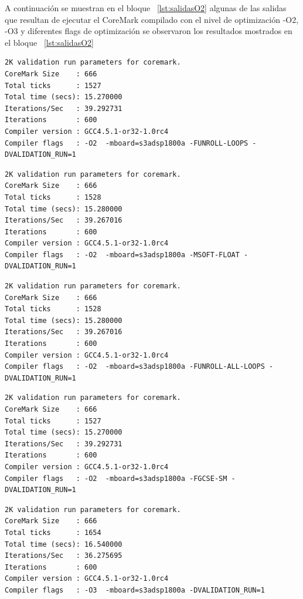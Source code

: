  A continuación se muestran en el bloque ~\ref{lst:salidasO2} algunas de las salidas que resultan de ejecutar el CoreMark compilado con el nivel de optimización -O2, -O3 y diferentes flags de optimización se observaron los resultados mostrados en el bloque ~\ref{lst:salidasO2}

\begin{lstlisting}[frame=single,caption={Optimización nivel -O2 - Flags activos : -FUNROLL-LOOPS },label={lst:salidasO2},breaklines]
2K validation run parameters for coremark.
CoreMark Size    : 666
Total ticks      : 1527
Total time (secs): 15.270000
Iterations/Sec   : 39.292731
Iterations       : 600
Compiler version : GCC4.5.1-or32-1.0rc4
Compiler flags   : -O2  -mboard=s3adsp1800a -FUNROLL-LOOPS -DVALIDATION_RUN=1  
\end{lstlisting}

\begin{lstlisting}[frame=single,caption={Optimización nivel -O2 - Flags activos : -MSOFT-FLOAT},label={lst:salidas},breaklines]
2K validation run parameters for coremark.
CoreMark Size    : 666
Total ticks      : 1528
Total time (secs): 15.280000
Iterations/Sec   : 39.267016
Iterations       : 600
Compiler version : GCC4.5.1-or32-1.0rc4
Compiler flags   : -O2  -mboard=s3adsp1800a -MSOFT-FLOAT -DVALIDATION_RUN=1  
\end{lstlisting}

\begin{lstlisting}[frame=single,caption={Optimización nivel -O2 - Flags activos : -FUNROLL-ALL-LOOPS},label={lst:salidas},breaklines]
2K validation run parameters for coremark.
CoreMark Size    : 666
Total ticks      : 1528
Total time (secs): 15.280000
Iterations/Sec   : 39.267016
Iterations       : 600
Compiler version : GCC4.5.1-or32-1.0rc4
Compiler flags   : -O2  -mboard=s3adsp1800a -FUNROLL-ALL-LOOPS -DVALIDATION_RUN=1  
\end{lstlisting}

\begin{lstlisting}[frame=single,caption={Optimización nivel -O2 - Flags activos : -FGCSE-SM},label={lst:salidas},breaklines]
2K validation run parameters for coremark.
CoreMark Size    : 666
Total ticks      : 1527
Total time (secs): 15.270000
Iterations/Sec   : 39.292731
Iterations       : 600
Compiler version : GCC4.5.1-or32-1.0rc4
Compiler flags   : -O2  -mboard=s3adsp1800a -FGCSE-SM -DVALIDATION_RUN=1  
\end{lstlisting}


\begin{lstlisting}[frame=single,caption={Optimización nivel -O3 - Sin Flags activos},label={lst:salidasO2},breaklines]
2K validation run parameters for coremark.
CoreMark Size    : 666
Total ticks      : 1654
Total time (secs): 16.540000
Iterations/Sec   : 36.275695
Iterations       : 600
Compiler version : GCC4.5.1-or32-1.0rc4
Compiler flags   : -O3  -mboard=s3adsp1800a -DVALIDATION_RUN=1  
\end{lstlisting}


